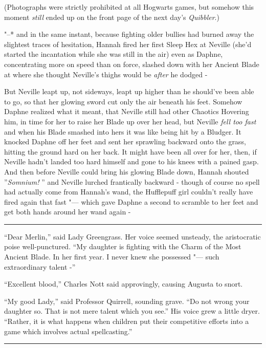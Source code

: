 (Photographs were strictly prohibited at all Hogwarts games, but somehow
this moment \emph{still} ended up on the front page of the next day's
\emph{Quibbler}.)

"--* and in the same instant, because fighting older bullies had burned
away the slightest traces of hesitation, Hannah fired her first Sleep
Hex at Neville (she'd started the incantation while she was still in the
air) even as Daphne, concentrating more on speed than on force, slashed
down with her Ancient Blade at where she thought Neville's thighs would
be \emph{after} he dodged -

But Neville leapt up, not sideways, leapt up higher than he should've
been able to go, so that her glowing sword cut only the air beneath his
feet. Somehow Daphne realized what it meant, that Neville still had
other Chaotics Hovering him, in time for her to raise her Blade up over
her head, but Neville \emph{fell too fast} and when his Blade smashed
into hers it was like being hit by a Bludger. It knocked Daphne off her
feet and sent her sprawling backward onto the grass, hitting the ground
hard on her back. It might have been all over for her, then, if Neville
hadn't landed too hard himself and gone to his knees with a pained gasp.
And then before Neville could bring his glowing Blade down, Hannah
shouted ''\emph{Somnium!} '' and Neville lurched frantically backward -
though of course no spell had actually come from Hannah's wand, the
Hufflepuff girl couldn't really have fired again that fast "--- which gave
Daphne a second to scramble to her feet and get both hands around her
wand again -

\begin{center}\rule{3in}{0.4pt}\end{center}

``Dear Merlin,'' said Lady Greengrass. Her voice seemed unsteady, the
aristocratic poise well-punctured. ``My daughter is fighting with the
Charm of the Most Ancient Blade. In her first year. I never knew she
possessed "--- such extraordinary talent -''

``Excellent blood,'' Charles Nott said approvingly, causing Augusta to
snort.

``My good Lady,'' said Professor Quirrell, sounding grave. ``Do not
wrong your daughter so. That is not mere talent which you see.'' His
voice grew a little dryer. ``Rather, it is what happens when children
put their competitive efforts into a game which involves actual
spellcasting.''

\begin{center}\rule{3in}{0.4pt}\end{center}

